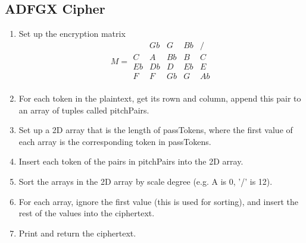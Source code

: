 \documentclass[14pt]{article}
\begin{document}
    	\subsection{ADFGX Cipher}
        \begin{enumerate}
            \item Set up the encryption matrix
            \[
            M = 
                \begin{array}{c|cccc}
                       & Gb & G  & Bb & /  \\
                    \hline
                    C  & A  & Bb & B  & C  \\
                    Eb & Db & D  & Eb & E  \\
                    F  & F  & Gb & G  & Ab \\
                \end{array}
            \]
            \item For each token in the plaintext, get its rown and column, append this pair to an array of tuples called pitchPairs.
            \item Set up a 2D array that is the length of passTokens, where the first value of each array is the corresponding token in passTokens.
            \item Insert each token of the pairs in pitchPairs into the 2D array.
            \item Sort the arrays in the 2D array by scale degree (e.g. A is 0, '/' is 12).
            \item For each array, ignore the first value (this is used for sorting), and insert the rest of the values into the ciphertext.
            \item Print and return the ciphertext.
        \end{enumerate}
        
\printbibliography[
heading=bibintoc,
title={Bibliography}
] %
\end{document}
